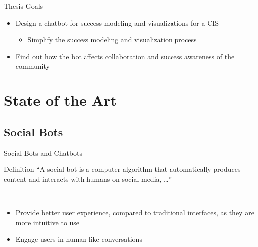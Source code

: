 \begin{frame}{Thesis Goals}
  \begin{itemize}
    \item Design a chatbot for success modeling and visualizations for a CIS
    \begin{itemize}
        \item Simplify the success modeling and visualization process
    \end{itemize}
    \item Find out how the bot affects collaboration and success awareness of the community %
  \end{itemize}
\end{frame}







\section{State of the Art}

\subsection{Social Bots}

\begin{frame}{Social Bots and Chatbots}
  \begin{block}{Definition}
    ``A social bot is a computer algorithm that automatically produces content and interacts with humans on social media, \dots'' \cite{FVD*16b}
  \end{block}
  \ \\
  \begin{itemize}
    \item Provide better user experience, compared to traditional interfaces, as they are more intuitive to use
    \item Engage users in human-like conversations 
\end{itemize}
\end{frame}


